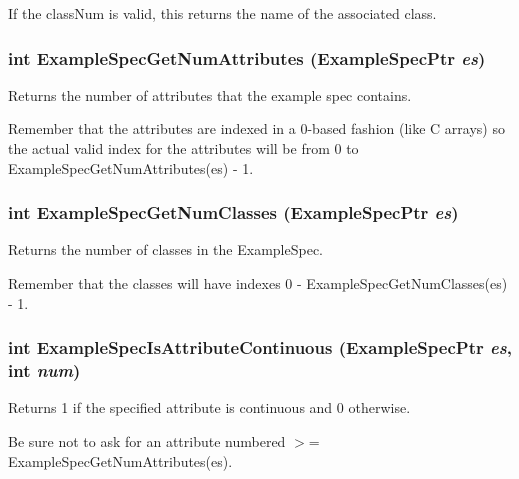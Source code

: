If the class\-Num is valid, this returns the name of the associated class. 

\subsubsection{\setlength{\rightskip}{0pt plus 5cm}int Example\-Spec\-Get\-Num\-Attributes ({\bf Example\-Spec\-Ptr} {\em es})}\label{ExampleSpec_8h_a33}


Returns the number of attributes that the example spec contains. 

Remember that the attributes are indexed in a 0-based fashion (like C arrays) so the actual valid index for the attributes will be from 0 to Example\-Spec\-Get\-Num\-Attributes(es) - 1. 
\subsubsection{\setlength{\rightskip}{0pt plus 5cm}int Example\-Spec\-Get\-Num\-Classes ({\bf Example\-Spec\-Ptr} {\em es})}\label{ExampleSpec_8h_a43}


Returns the number of classes in the Example\-Spec. 

Remember that the classes will have indexes 0 - Example\-Spec\-Get\-Num\-Classes(es) - 1. 
\subsubsection{\setlength{\rightskip}{0pt plus 5cm}int Example\-Spec\-Is\-Attribute\-Continuous ({\bf Example\-Spec\-Ptr} {\em es}, int {\em num})}\label{ExampleSpec_8h_a35}


Returns 1 if the specified attribute is continuous and 0 otherwise. 

Be sure not to ask for an attribute numbered $>$= Example\-Spec\-Get\-Num\-Attributes(es). 

